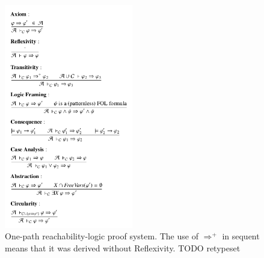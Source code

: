 \begin{figure}
    \centering
    \includegraphics[width=0.5\textwidth]{img/onepath-rl.png}
    \caption{One-path reachability-logic proof system.
    The use of $\Rightarrow^+$ in sequent means that it was derived without Reflexivity.
    TODO retypeset}
    \label{fig:RLproofsystem}
\end{figure}



